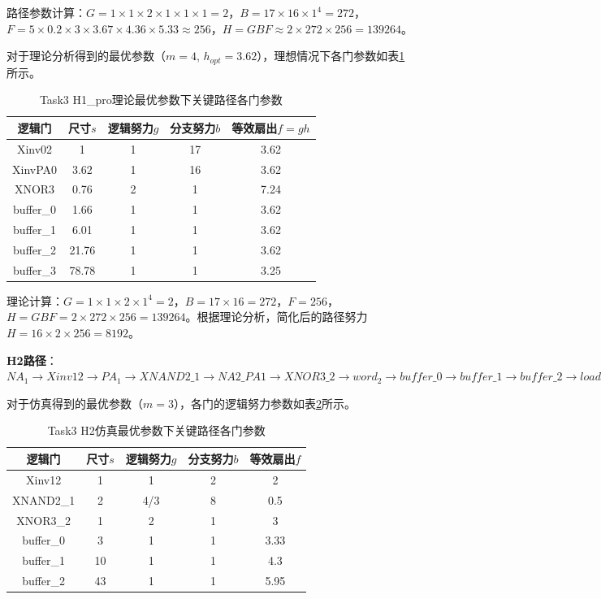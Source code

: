 \documentclass[UTF8,12pt,a4paper]{ctexart}
\begin{document}
路径参数计算：$G = 1 \times 1 \times 2 \times 1 \times 1 \times 1 = 2$，$B = 17 \times 16 \times 1^4 = 272$，$F = 5 \times 0.2 \times 3 \times 3.67 \times 4.36 \times 5.33 \approx 256$，$H = GBF \approx 2 \times 272 \times 256 = 139264$。

对于理论分析得到的最优参数（$m=4$, $h_{opt}=3.62$），理想情况下各门参数如表\ref{tab:task3_h1pro_theo_params}所示。

\begin{table}[htbp]
\centering
\caption{Task3 H1\_pro理论最优参数下关键路径各门参数}
\label{tab:task3_h1pro_theo_params}
\begin{tabular}{|c|c|c|c|c|}
\hline
逻辑门 & 尺寸$s$ & 逻辑努力$g$ & 分支努力$b$ & 等效扇出$f=gh$ \\
\hline
Xinv02 & 1 & 1 & 17 & 3.62 \\
XinvPA0 & 3.62 & 1 & 16 & 3.62 \\
XNOR3 & 0.76 & 2 & 1 & 7.24 \\
buffer\_0 & 1.66 & 1 & 1 & 3.62 \\
buffer\_1 & 6.01 & 1 & 1 & 3.62 \\
buffer\_2 & 21.76 & 1 & 1 & 3.62 \\
buffer\_3 & 78.78 & 1 & 1 & 3.25 \\
\hline
\end{tabular}
\end{table}

理论计算：$G = 1 \times 1 \times 2 \times 1^4 = 2$，$B = 17 \times 16 = 272$，$F = 256$，$H = GBF = 2 \times 272 \times 256 = 139264$。根据理论分析，简化后的路径努力$H = 16 \times 2 \times 256 = 8192$。

\textbf{H2路径}：$NA_1 \rightarrow Xinv12 \rightarrow PA_1 \rightarrow XNAND2\_1 \rightarrow NA2\_PA1 \rightarrow XNOR3\_2 \rightarrow word_2 \rightarrow buffer\_0 \rightarrow buffer\_1 \rightarrow buffer\_2 \rightarrow load$

对于仿真得到的最优参数（$m=3$），各门的逻辑努力参数如表\ref{tab:task3_h2_sim_params}所示。

\begin{table}[htbp]
\centering
\caption{Task3 H2仿真最优参数下关键路径各门参数}
\label{tab:task3_h2_sim_params}
\begin{tabular}{|c|c|c|c|c|}
\hline
逻辑门 & 尺寸$s$ & 逻辑努力$g$ & 分支努力$b$ & 等效扇出$f$ \\
\hline
Xinv12 & 1 & 1 & 2 & 2 \\
XNAND2\_1 & 2 & 4/3 & 8 & 0.5 \\
XNOR3\_2 & 1 & 2 & 1 & 3 \\
buffer\_0 & 3 & 1 & 1 & 3.33 \\
buffer\_1 & 10 & 1 & 1 & 4.3 \\
buffer\_2 & 43 & 1 & 1 & 5.95 \\
\hline
\end{tabular}
\end{table}
\end{document}
